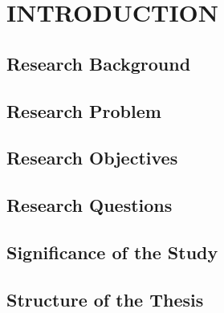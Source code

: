 

\chapter{INTRODUCTION}\label{chap:introduction}


\section{Research Background}\label{sec:background}

\section{Research Problem}\label{sec:problem}

\section{Research Objectives}\label{sec:objectives}

\section{Research Questions}\label{sec:questions}

\section{Significance of the Study}\label{sec:significance}

\section{Structure of the Thesis}\label{sec:structure}
